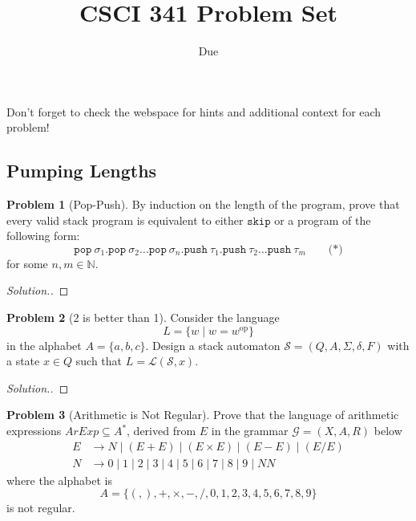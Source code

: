 \documentclass[11pt]{article}
\title{CSCI 341 Problem Set \pset}
\author{\subtitle}
\date{Due
    \duedate
}
\theoremstyle{theorem} %
\theoremstyle{definition} %
\newtheorem{problem}                    {{\color{BurntOrange}Problem}}
\theoremstyle{remark} %
\begin{document}
\maketitle

Don't forget to check the webspace for hints and additional context for each problem!

\subsection*{Pumping Lengths}

\begin{problem}
    [Pop-Push]
    By induction on the length of the program, prove that every valid stack program is equivalent to either \(\mathtt{skip}\) or a program of the following form:
    \[
        \mathtt{pop}~\sigma_1 {.}
        \mathtt{pop}~\sigma_2 \dots
        \mathtt{pop}~\sigma_n {.}
        \mathtt{push}~\tau_1 {.}
        \mathtt{push}~\tau_2 \dots
        \mathtt{push}~\tau_m
        \qquad \text{(*)}
    \]
    for some \(n,m \in \mathbb N\).
\end{problem}

\begin{proof}[Solution.]
    
\end{proof}

\begin{problem}
    [2 is better than 1]
    Consider the language 
    \[
        L = \{w \mid w = w^{\text{op}}\}
    \]
    in the alphabet \(A = \{a, b, c\}\).
    Design a stack automaton \(\mathcal S = (Q, A, \Sigma, \delta, F)\) with a state \(x\in Q\) such that \(L = \mathcal L(\mathcal S, x)\).
\end{problem}

\begin{proof}
    [Solution.]
\end{proof}

\begin{problem}
    [Arithmetic is Not Regular]
    Prove that the language of arithmetic expressions \(\mathit{ArExp} \subseteq A^*\), derived from \(E\) in the grammar \(\mathcal G = (X, A, R)\) below
    \[\begin{aligned}
        E &\to 
            N
            \mid (E + E)
            \mid (E \times E)
            \mid (E - E)
            \mid (E / E) \\
        N &\to 0 \mid 1 \mid 2 \mid 3 \mid 4 \mid 5 \mid 6 \mid 7 \mid 8 \mid 9 \mid NN
    \end{aligned}\]
    where the alphabet is
    \[
        A = \big\{ (, ), +, \times, -, /, 0,1,2,3,4,5,6,7,8,9 \big\}
    \]
    is not regular. 
\end{problem}
\end{document}
